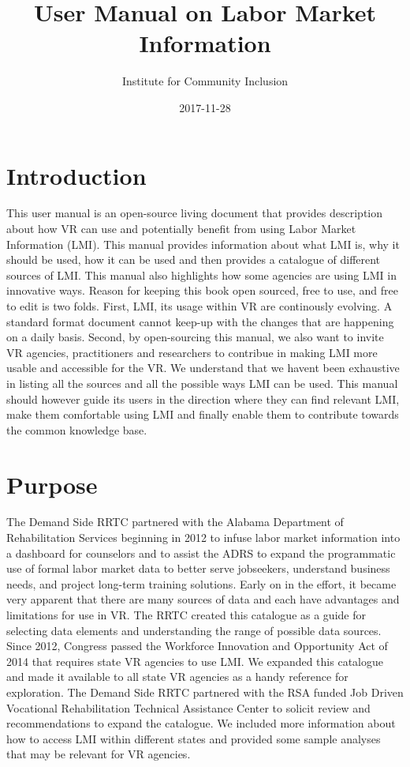 \documentclass[]{book}
\title{User Manual on Labor Market Information}
\author{Institute for Community Inclusion}
\date{2017-11-28}
\theoremstyle{definition}
\theoremstyle{definition}
\theoremstyle{definition}
\theoremstyle{remark}
\begin{document}
\maketitle

{
\setcounter{tocdepth}{1}
\tableofcontents
}
\chapter*{Introduction}\label{introduction}

This user manual is an open-source living document that provides
description about how VR can use and potentially benefit from using
Labor Market Information (LMI). This manual provides information about
what LMI is, why it should be used, how it can be used and then provides
a catalogue of different sources of LMI. This manual also highlights how
some agencies are using LMI in innovative ways. Reason for keeping this
book open sourced, free to use, and free to edit is two folds. First,
LMI, its usage within VR are continously evolving. A standard format
document cannot keep-up with the changes that are happening on a daily
basis. Second, by open-sourcing this manual, we also want to invite VR
agencies, practitioners and researchers to contribue in making LMI more
usable and accessible for the VR. We understand that we havent been
exhaustive in listing all the sources and all the possible ways LMI can
be used. This manual should however guide its users in the direction
where they can find relevant LMI, make them comfortable using LMI and
finally enable them to contribute towards the common knowledge base.

\chapter{Purpose}\label{purpose}

The Demand Side RRTC partnered with the Alabama Department of
Rehabilitation Services beginning in 2012 to infuse labor market
information into a dashboard for counselors and to assist the ADRS to
expand the programmatic use of formal labor market data to better serve
jobseekers, understand business needs, and project long-term training
solutions. Early on in the effort, it became very apparent that there
are many sources of data and each have advantages and limitations for
use in VR. The RRTC created this catalogue as a guide for selecting data
elements and understanding the range of possible data sources. Since
2012, Congress passed the Workforce Innovation and Opportunity Act of
2014 that requires state VR agencies to use LMI. We expanded this
catalogue and made it available to all state VR agencies as a handy
reference for exploration. The Demand Side RRTC partnered with the RSA
funded Job Driven Vocational Rehabilitation Technical Assistance Center
to solicit review and recommendations to expand the catalogue. We
included more information about how to access LMI within different
states and provided some sample analyses that may be relevant for VR
agencies.
\end{document}
